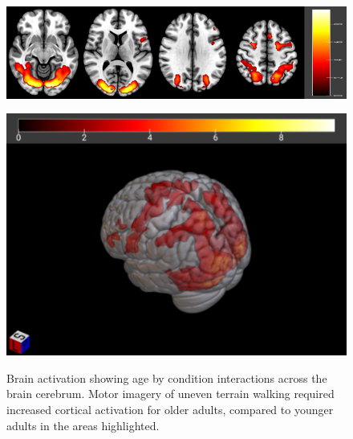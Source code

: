 \documentclass[a4paper,fleqn]{cas-sc}
\begin{document}
\begin{figure}[h]
    \centering
    \begin{minipage}{0.55\textwidth}
        \centering
        \includegraphics[clip, trim=0 0 0 0, width=\linewidth]{figs/brainSlice_Interaction.png} %
         \label{fig:a}
    \end{minipage}
    \begin{minipage}{0.35\textwidth}
        \centering
        \includegraphics[clip, trim=0 0 0 0, width=\linewidth]{figs/brain_Interaction.png} %
         \label{fig:b}
    \end{minipage}
    \caption{Brain activation showing age by condition interactions across the brain cerebrum. Motor imagery of uneven terrain walking required increased cortical activation for older adults, compared to younger adults in the areas highlighted. }
    \label{fig:MotorImagery_cerebrum_interaction}
\end{figure}
\end{document}
